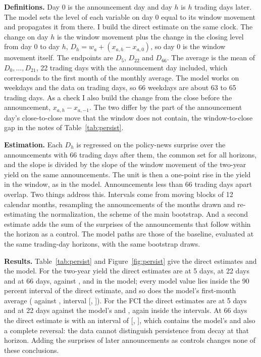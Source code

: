\documentclass[11pt]{article}
\begin{document}
\begin{appendices}
\textbf{Definitions.} Day 0 is the announcement day and day $h$ is $h$ trading days later. The model sets the level of each variable on day 0 equal to its window movement and propagates it from there. I build the direct estimate on the same clock. The change on day $h$ is the window movement plus the change in the closing level from day 0 to day $h$, $D_h=w_a+(x_{a,h}-x_{a,0})$, so day 0 is the window movement itself. The endpoints are $D_5$, $D_{22}$ and $D_{66}$. The average is the mean of $D_0,\dots,D_{21}$, 22 trading days with the announcement day included, which corresponds to the first month of the monthly average. The model works on weekdays and the data on trading days, so 66 weekdays are about 63 to 65 trading days. As a check I also build the change from the close before the announcement, $x_{a,h}-x_{a,-1}$. The two differ by the part of the announcement day's close-to-close move that the window does not contain, the window-to-close gap in the notes of Table~\ref{tab:persist}.

\textbf{Estimation.} Each $D_h$ is regressed on the policy-news surprise over the  announcements with 66 trading days after them, the common set for all horizons, and the slope is divided by the slope of the window movement of the two-year yield on the same announcements. The unit is then a one-point rise in the yield in the window, as in the model. Announcements less than 66 trading days apart overlap. Two things address this. Intervals come from moving blocks of 12 calendar months, resampling the announcements of the months drawn and re-estimating the normalization, the scheme of the main bootstrap. And a second estimate adds the sum of the surprises of the announcements that follow within the horizon as a control. The model paths are those of the baseline, evaluated at the same trading-day horizons, with the same bootstrap draws.

\textbf{Results.} Table~\ref{tab:persist} and Figure~\ref{fig:persist} give the direct estimates and the model. For the two-year yield the direct estimates are  at 5 days,  at 22 days and  at 66 days, against ,  and  in the model; every model value lies inside the 90 percent interval of the direct estimate, and so does the model's first-month average ( against , interval [, ]). For the FCI the direct estimates are  at 5 days and  at 22 days against the model's  and , again inside the intervals. At 66 days the direct estimate is  with an interval of [, ], which contains the model's  and also a complete reversal: the data cannot distinguish persistence from decay at that horizon. Adding the surprises of later announcements as controls changes none of these conclusions.


\end{appendices}
\end{document}
